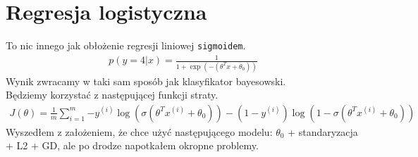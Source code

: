\documentclass[a4paper,12pt]{article}
\begin{document}
\section{Regresja logistyczna}
To nic innego jak obłożenie regresji liniowej \texttt{sigmoidem}.
\begin{align*}
    p(y=4|x) = \frac{1}{1 + \exp(-(\theta^T x + \theta_0))}
\end{align*}
Wynik zwracamy w taki sam sposób jak klasyfikator bayesowski. \\
Będziemy korzystać z następującej funkcji straty. 
\begin{align*}
    J(\theta) = \frac{1}{m}\sum_{i=1}^{m}{-y^{(i)}\log(\sigma(\theta^T x^{(i)} + \theta_0)) - (1 - y^{(i)})\log(1 - \sigma(\theta^T x^{(i)} + \theta_0))}
\end{align*}
Wyszedłem z założeniem, że chce użyć następującego modelu: $\theta_0$ + standaryzacja + L2 + GD, ale po drodze napotkałem okropne problemy.
\end{document}
